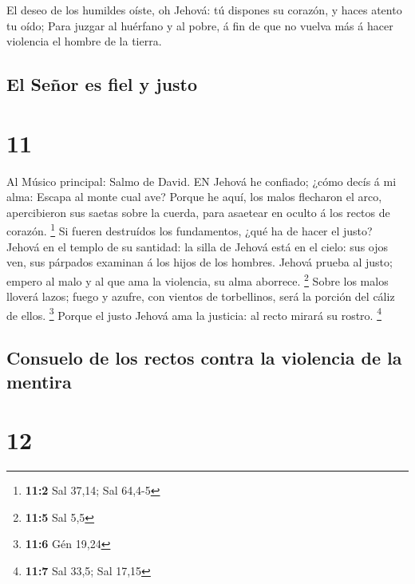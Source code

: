 El deseo de los humildes oíste, oh Jehová: tú dispones su
corazón, y haces atento tu oído;  Para juzgar al huérfano y
al pobre, á fin de que no vuelva más á hacer violencia el hombre de la
tierra.

\hypertarget{el-seuxf1or-es-fiel-y-justo}{%
\subsection{El Señor es fiel y
justo}\label{el-seuxf1or-es-fiel-y-justo}}

\hypertarget{section-10}{%
\section{11}\label{section-10}}

 Al Músico principal: Salmo de David. EN Jehová he confiado;
¿cómo decís á mi alma: Escapa al monte cual ave?  Porque he
aquí, los malos flecharon el arco, apercibieron sus saetas sobre la
cuerda, para asaetear en oculto á los rectos de corazón. \footnote{\textbf{11:2}
  Sal 37,14; Sal 64,4-5}  Si fueren destruídos los
fundamentos, ¿qué ha de hacer el justo?  Jehová en el templo
de su santidad: la silla de Jehová está en el cielo: sus ojos ven, sus
párpados examinan á los hijos de los hombres.  Jehová prueba
al justo; empero al malo y al que ama la violencia, su alma aborrece.
\footnote{\textbf{11:5} Sal 5,5}  Sobre los malos lloverá
lazos; fuego y azufre, con vientos de torbellinos, será la porción del
cáliz de ellos. \footnote{\textbf{11:6} Gén 19,24}  Porque
el justo Jehová ama la justicia: al recto mirará su rostro. \footnote{\textbf{11:7}
  Sal 33,5; Sal 17,15}

\hypertarget{consuelo-de-los-rectos-contra-la-violencia-de-la-mentira}{%
\subsection{Consuelo de los rectos contra la violencia de la
mentira}\label{consuelo-de-los-rectos-contra-la-violencia-de-la-mentira}}

\hypertarget{section-11}{%
\section{12}\label{section-11}}

